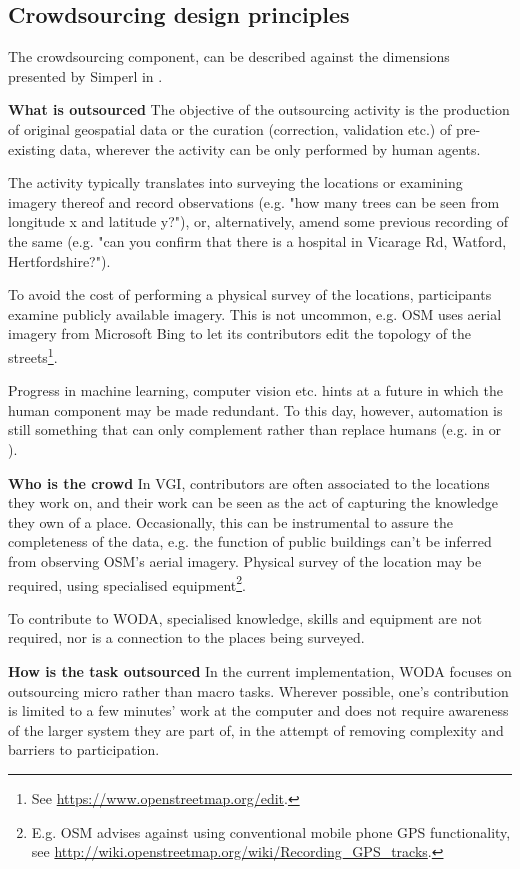 \subsection{Crowdsourcing design principles}

The crowdsourcing component, can be described against the dimensions presented by Simperl in \cite{Simperl:2015ju}. 

\textbf{What is outsourced} The objective of the outsourcing activity is the production of original geospatial data or the curation (correction, validation etc.) of pre-existing data, wherever the activity can be only performed by human agents. 

The activity typically translates into surveying the locations or examining imagery thereof and record observations (e.g. "how many trees can be seen from longitude x and latitude y?"), or, alternatively, amend some previous recording of the same (e.g. "can you confirm that there is a hospital in Vicarage Rd, Watford, Hertfordshire?"). 

To avoid the cost of performing a physical survey of the locations, participants examine publicly available imagery. This is not uncommon, e.g. OSM uses aerial imagery from Microsoft Bing to let its contributors edit the topology of the streets\footnote{See \url{https://www.openstreetmap.org/edit}.}.

Progress in machine learning, computer vision etc. hints at a future in which the human component may be made redundant. To this day, however, automation is still something that can only complement rather than replace humans (e.g. in \cite{Goetz:1gd} or \cite{Schmid:2012we}).

\textbf{Who is the crowd} In VGI, contributors are often associated to the locations they work on, and their work can be seen as the act of capturing the knowledge they own of a place. Occasionally, this can be instrumental to assure the completeness of the data, e.g. the function of public buildings can't be inferred from observing OSM's aerial imagery. Physical survey of the location may be required, using specialised equipment\footnote{E.g. OSM advises against using conventional mobile phone GPS functionality, see \url{http://wiki.openstreetmap.org/wiki/Recording_GPS_tracks}.}.

To contribute to WODA, specialised knowledge, skills and equipment are not required, nor is a connection to the places being surveyed. 

\textbf{How is the task outsourced} In the current implementation, WODA focuses on outsourcing micro rather than macro tasks. Wherever possible, one's contribution is limited to a few minutes' work at the computer and does not require awareness of the larger system they are part of, in the attempt of removing complexity and barriers to participation.

